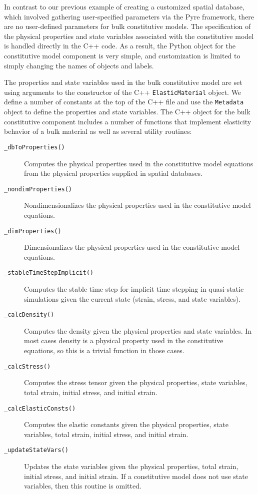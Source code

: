In contrast to our previous example of creating a customized spatial
database, which involved gathering user-specified parameters via the
Pyre framework, there are no user-defined parameters for bulk constitutive
models. The specification of the physical properties and state variables
associated with the constitutive model is handled directly in the
C++ code. As a result, the Python object for the constitutive model
component is very simple, and customization is limited to simply changing
the names of objects and labels.

The properties and state variables used in the bulk constitutive model
are set using arguments to the constructor of the C++ \texttt{ElasticMaterial}
object. We define a number of constants at the top of the C++ file
and use the \texttt{Metadata} object to define the properties and
state variables. The C++ object for the bulk constitutive component
includes a number of functions that implement elasticity behavior
of a bulk material as well as several utility routines:
\begin{description}
\item [{\texttt{\_dbToProperties()}}] Computes the physical properties
used in the constitutive model equations from the physical properties
supplied in spatial databases.
\item [{\texttt{\_nondimProperties()}}] Nondimensionalizes the physical
properties used in the constitutive model equations.
\item [{\texttt{\_dimProperties()}}] Dimensionalizes the physical properties
used in the constitutive model equations.
\item [{\texttt{\_stableTimeStepImplicit()}}] Computes the stable time
step for implicit time stepping in quasi-static simulations given
the current state (strain, stress, and state variables).
\item [{\texttt{\_calcDensity()}}] Computes the density given the physical
properties and state variables. In most cases density is a physical
property used in the constitutive equations, so this is a trivial
function in those cases.
\item [{\texttt{\_calcStress()}}] Computes the stress tensor given the
physical properties, state variables, total strain, initial stress,
and initial strain.
\item [{\texttt{\_calcElasticConsts()}}] Computes the elastic constants
given the physical properties, state variables, total strain, initial
stress, and initial strain.
\item [{\texttt{\_updateStateVars()}}] Updates the state variables given
the physical properties, total strain, initial stress, and initial
strain. If a constitutive model does not use state variables, then
this routine is omitted.
\end{description}
